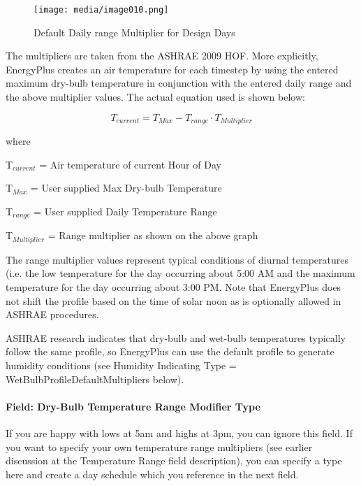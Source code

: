 \begin{figure}[hbtp] %
\centering
\texttt{[image: media/image010.png]}
\caption{Default Daily range Multiplier for Design Days \protect \label{fig:default-daily-range-multiplier-for-design}}
\end{figure}

The multipliers are taken from the ASHRAE 2009 HOF. More explicitly, EnergyPlus creates an air temperature for each timestep by using the entered maximum dry-bulb temperature in conjunction with the entered daily range and the above multiplier values. The actual equation used is shown below:

\begin{equation}
{T_{current}} = {T_{Max}} - {T_{range}}\cdot {T_{Multiplier}}
\end{equation}

where

T\(_{current}\) = Air temperature of current Hour of Day

T\(_{Max}\) = User supplied Max Dry-bulb Temperature

T\(_{range}\) = User supplied Daily Temperature Range

T\(_{Multiplier}\) = Range multiplier as shown on the above graph

The range multiplier values represent typical conditions of diurnal temperatures (i.e. the low temperature for the day occurring about 5:00 AM and the maximum temperature for the day occurring about 3:00 PM. Note that EnergyPlus does not shift the profile based on the time of solar noon as is optionally allowed in ASHRAE procedures.

ASHRAE research indicates that dry-bulb and wet-bulb temperatures typically follow the same profile, so EnergyPlus can use the default profile to generate humidity conditions (see Humidity Indicating Type = WetBulbProfileDefaultMultipliers below).

\paragraph{Field: Dry-Bulb Temperature Range Modifier Type}\label{field-dry-bulb-temperature-range-modifier-type}

If you are happy with lows at 5am and highs at 3pm, you can ignore this field. If you want to specify your own temperature range multipliers (see earlier discussion at the Temperature Range field description), you can specify a type here and create a day schedule which you reference in the next field.


